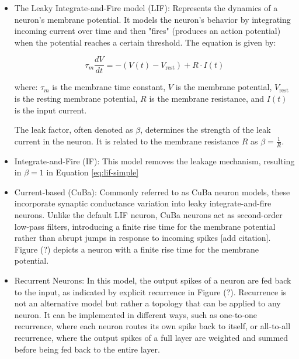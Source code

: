 \begin{itemize}

    \item The Leaky Integrate-and-Fire model (LIF): Represents the dynamics of a neuron's membrane potential. It models the neuron's behavior by integrating incoming current over time and then "fires" (produces an action potential) when the potential reaches a certain threshold. The equation is given by:
    
    \begin{equation}
    \tau_m \frac{{dV}}{{dt}} = -(V(t) - V_{\text{rest}}) + R \cdot I(t) \label{eq:lif-simple}
    \end{equation}
    
    where:
    \( \tau_m \) is the membrane time constant,
    \( V \) is the membrane potential,
    \( V_{\text{rest}} \) is the resting membrane potential,
    \( R \) is the membrane resistance,
    and \( I(t) \) is the input current.
    
    The leak factor, often denoted as \( \beta \), determines the strength of the leak current in the neuron. It is related to the membrane resistance \( R \) as \( \beta = \frac{1}{R} \).

    \item Integrate-and-Fire (IF): This model removes the leakage mechanism, resulting in \(\beta = 1\) in Equation \ref{eq:lif-simple}
    
    \item Current-based (CuBa): Commonly referred to as CuBa neuron models, these incorporate synaptic conductance variation into leaky integrate-and-fire neurons. Unlike the default LIF neuron, CuBa neurons act as second-order low-pass filters, introducing a finite rise time for the membrane potential rather than abrupt jumps in response to incoming spikes [add citation]. Figure (?) depicts a neuron with a finite rise time for the membrane potential.
    
    \item Recurrent Neurons\cite{williams1989learning}: In this model, the output spikes of a neuron are fed back to the input, as indicated by explicit recurrence in Figure (?). Recurrence is not an alternative model but rather a topology that can be applied to any neuron. It can be implemented in different ways, such as one-to-one recurrence, where each neuron routes its own spike back to itself, or all-to-all recurrence, where the output spikes of a full layer are weighted and summed before being fed back to the entire layer.


\end{itemize}
